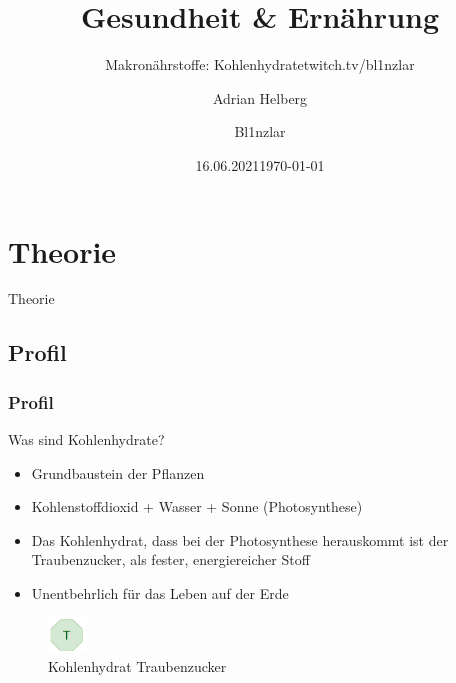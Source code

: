 \documentclass[xcolor=dvipsnames]{beamer}
\title{Gesundheit \& Ernährung}
\subtitle{Makronährstoffe: Kohlenhydrate}
\author{Adrian Helberg}
\date{16.06.2021}
\subtitle{twitch.tv/bl1nzlar}
\author{Bl1nzlar}
\date{\today}
\begin{document}
    \maketitle


    \section{Theorie}
    {
    \begin{frame}
        \begin{center}
            \Huge Theorie
        \end{center}
    \end{frame}
    }

    \subsection{Profil}
    \begin{frame}
        \frametitle{Profil}

        \begin{block}{Was sind Kohlenhydrate?}
            \begin{itemize}
                \setlength\itemsep{1em}
                \item Grundbaustein der Pflanzen
                \item Kohlenstoffdioxid + Wasser + Sonne (Photosynthese)
                \item Das Kohlenhydrat, dass bei der Photosynthese herauskommt ist der Traubenzucker, als fester, energiereicher Stoff
                \item Unentbehrlich für das Leben auf der Erde
            \end{itemize}
        \end{block}

        \begin{figure}
            \centering
            \includegraphics[width=1cm]{../images/t.png}
            \caption{Kohlenhydrat Traubenzucker}
        \end{figure}
    \end{frame}
\end{document}
